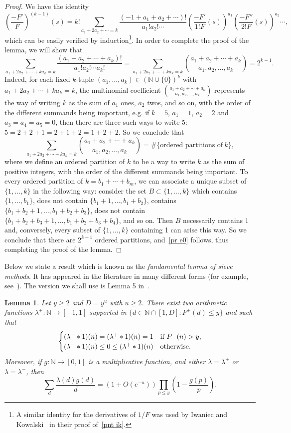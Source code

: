 \documentclass[12pt]{amsart}
\newtheorem{lemma}[theorem]{Lemma}
\theoremstyle{remark}
\newcommand {\SN} {{\mathbb N}}
\newcommand{\be}{\begin{equation}}
\newcommand{\ee}{\end{equation}}
\newcommand{\bes}{\begin{equation*}}
\newcommand{\ees}{\end{equation*}}
\numberwithin{equation}{section}
\begin{document}
\begin{proof} We have the identity
\bes\label{id3}
\left(\frac{-F'}{F}\right)^{(k-1)}(s)=k!\sum_{a_1+2a_2+\cdots=k}\frac{(-1+a_1+a_2+\cdots)!}{a_1!a_2!\cdots}
\left(\frac{-F'}{1!F}(s)\right)^{a_1}\left(\frac{-F''}{2!F}(s)\right)^{a_2}\cdots,
\ees
which can be easily verified by induction\footnote{A similar identity for the derivatives of $1/F$ was used by Iwaniec and Kowalski~\cite[p. 40]{ik} in their proof of~\eqref{pnt ik}.}. In order to complete the proof of the lemma, we will show that
\be\label{pr e0}
\sum_{a_1+2a_2+\cdots+ka_k=k}\frac{(a_1+a_2+\cdots+a_k)!}{a_1!a_2!\cdots a_k!}=\sum_{a_1+2a_2+\cdots+ka_k=k}\binom{a_1+a_2+\cdots+a_k}{a_1,a_2,\dots,a_k}=2^{k-1}.
\ee
Indeed, for each fixed $k$-tuple $(a_1,\dots,a_k)\in(\SN\cup\{0\})^k$ with $a_1+2a_2+\cdots+ka_k=k$, the multinomial coefficient $\binom{a_1+a_2+\cdots+a_k}{a_1,a_2,\dots,a_k}$ represents the way of writing $k$ as the sum of $a_1$ ones, $a_2$ twos, and so on, with the order of the different summands being important, e.g. if $k=5$, $a_1=1$, $a_2=2$ and $a_3=a_4=a_5=0$, then there are three such ways to write 5: $5=2+2+1=2+1+2=1+2+2$. So we conclude that
\bes
\sum_{a_1+2a_2+\cdots+ka_k=k}\binom{a_1+a_2+\cdots+a_k}{a_1,a_2,\dots,a_k}=\#\{\text{ordered partitions of}\ k\},
\ees
where we define an ordered partition of $k$ to be a way to write $k$ as the sum of positive integers, with the order of the different summands being important. To every ordered partition of $k=b_1+\cdots+b_m$, we can associate a unique subset of $\{1,\dots,k\}$ in the following way: consider the set $B\subset\{1,\dots,k\}$ which contains $\{1,\dots,b_1\}$, does not contain $\{b_1+1,\dots,b_1+b_2\}$, contains $\{b_1+b_2+1,\dots,b_1+b_2+b_3\}$, does not contain $\{b_1+b_2+b_3+1,\dots,b_1+b_2+b_3+b_4\}$, and so on. Then $B$ necessarily contains $1$ and, conversely, every subset of $\{1,\dots,k\}$ containing 1 can arise this way. So we conclude that there are $2^{k-1}$ ordered partitions, and~\eqref{pr e0} follows, thus completing the proof of the lemma.
\end{proof}

Below we state a result which is known as the {\it fundamental lemma of sieve methods}. It has appeared in the literature in many different forms (for example, see~\cite[Theorem 7.2]{halb}). The version we shall use is Lemma 5 in~\cite{fi}.

\begin{lemma}\label{fund} Let $y\ge2$ and $D=y^u$ with $u\ge2$. There exist two arithmetic functions $\lambda^\pm:\SN\to[-1,1]$ supported in $\{d\in\SN\cap[1,D]:P^+(d)\le y\}$ and such that
$$
\begin{cases}(\lambda^-*1)(n)=(\lambda^+*1)(n)=1&\text{if}~P^-(n)>y,\cr (\lambda^-*1)(n)\le0\le(\lambda^+*1)(n)&\text{otherwise}.\end{cases}
$$
Moreover, if $g:\SN\to[0,1]$ is a multiplicative function, and either $\lambda=\lambda^+$ or $\lambda=\lambda^-$, then
$$
\sum_d\frac{\lambda(d)g(d)}d=\left(1+O(e^{-u})\right)\prod_{p\le y}\left(1-\frac{g(p)}p\right).
$$
\end{lemma}
\end{document}
